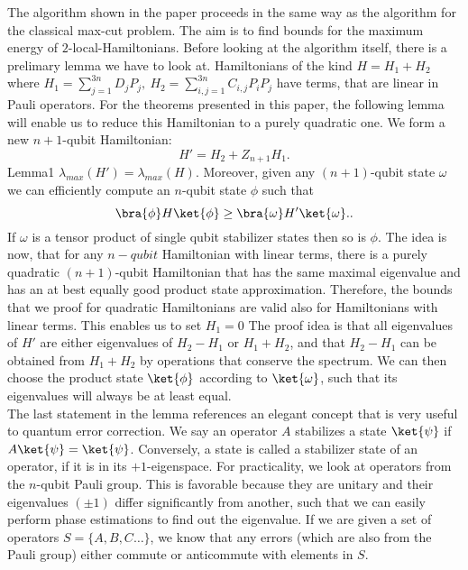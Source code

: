 The algorithm shown in the paper proceeds in the same way as the algorithm for the classical max-cut problem.
The aim is to find bounds for the maximum energy of $2$-local-Hamiltonians.
Before looking at the algorithm itself, there is a prelimary lemma we have to look at.
Hamiltonians of the kind $H = H_1+H_2$ where $H_1 = \sum_{j=1}^{3n} D_jP_j, ~ H_2  = \sum_{i,j=1}^{3n} C_{i,j}P_iP_j$ have terms, that are linear in Pauli operators.
For the theorems presented in this paper, the following lemma will enable us to reduce this Hamiltonian to a purely quadratic one.
We form a new $n+1$-qubit Hamiltonian: \[
H'=H_2+Z_{n+1}H_1
.\]
Lemma1
	$\lambda_{max}\left( H' \right) =\lambda_{max}\left( H \right)$. Moreover, given any $(n+1)$-qubit state  $\omega$ we can efficiently compute an $n$-qubit state $\phi$ such that \[
	\bra{\phi}H\ket{\phi} \ge \bra{\omega}H'\ket{\omega}.
	.\]
If $\omega$ is a tensor product of single qubit stabilizer states then so is $\phi$.
The idea is now, that for any $n-qubit$ Hamiltonian with linear terms, there is a purely quadratic $(n+1)$-qubit Hamiltonian that has the same maximal eigenvalue and has an at best equally good product state approximation.
Therefore, the bounds that we proof for quadratic Hamiltonians are valid also for Hamiltonians with linear terms.
This enables us to set $H_1=0$
The proof idea is that all eigenvalues of $H'$ are either eigenvalues of $H_2-H_1$ or $H_1+H_2$, and that $H_2-H_1$ can be obtained from $H_1+H_2$ by operations that conserve the spectrum.
We can then choose the product state $\ket{\phi}$ according to $\ket{\omega}$, such that its eigenvalues will always be at least equal.  \\
The last statement in the lemma references an elegant concept that is very useful to quantum error correction.
We say an operator $A$ stabilizes a state $\ket{\psi}$ if $A\ket{\psi}=\ket{\psi}$.
Conversely, a state is called a stabilizer state of an operator, if it is in its $+1$-eigenspace.
For practicality, we look at operators from the $n$-qubit Pauli group.
This is favorable because they are unitary and their eigenvalues  $(\pm 1)$ differ significantly from another, such that we can easily perform phase estimations to find out the eigenvalue.
If we are given a set of operators $S=\{A,B,C\ldots\}$, we know that any errors (which are also from the Pauli group) either commute or anticommute with elements in $S$.
